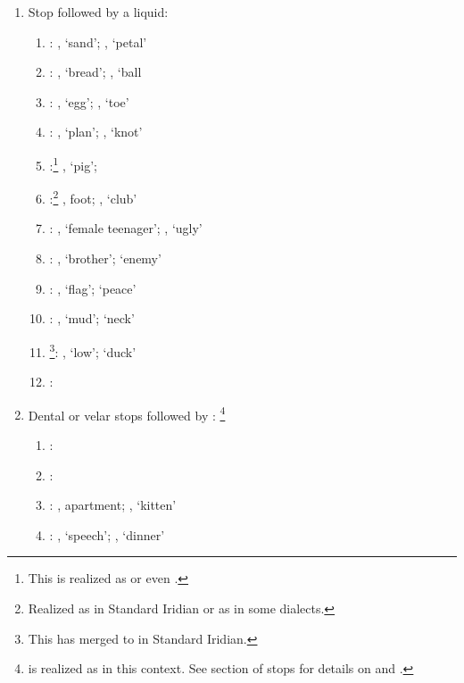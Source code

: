 \begin{enumerate}
	\item Stop followed by a liquid:
		\begin{enumerate}
			\item {}:  , `sand';  , `petal'
			\item {}:  , `bread';  , `ball
			\item {}:  , `egg';  , `toe'
			\item {}:  , `plan'; ,  `knot'
			\item {}:\footnote{This is realized as  or even \pn{\llb}.}  , `pig';  
			\item {}:\footnote{Realized as  in Standard Iridian or as  in some dialects.}  , foot;  , `club'
			\item {}:  , `female teenager';  , `ugly'
			\item {}:  , `brother';   `enemy'
			\item {}:  , `flag';   `peace'
			\item {}:  , `mud';   `neck'
			\item {}\footnote{This has merged to  in Standard Iridian.}:  , `low';   `duck'
			\item {}:  
		\end{enumerate}
	\item Dental or velar stops followed by : \footnote{ is realized as  in this context. See section of stops for details on  and .}
		\begin{enumerate}
			\item {}:
			\item {}:
			\item {}:  , apartment;  , `kitten'
			\item {}:  , `speech';  , `dinner'

\end{enumerate}
\end{enumerate}

